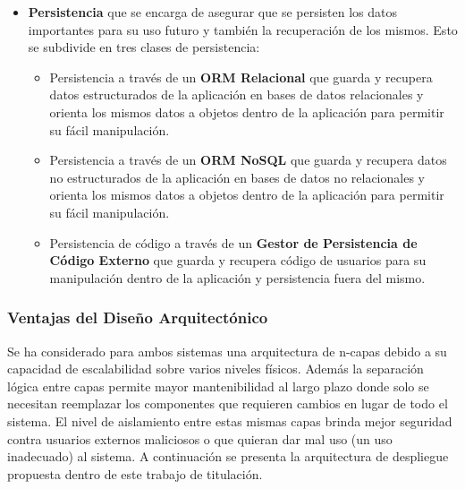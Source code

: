 \begin{itemize}
\begin{itemize}
    \end{itemize}
	\item \textbf{Persistencia} que se encarga de asegurar que se persisten los datos importantes para su uso futuro y también la recuperación de los mismos. Esto se subdivide en tres clases de persistencia:
    \begin{itemize}
    	\item Persistencia a través de un \textbf{ORM Relacional} que guarda y recupera datos estructurados de la aplicación en bases de datos relacionales y orienta los mismos datos a objetos dentro de la aplicación para permitir su fácil manipulación.
		\item Persistencia a través de un \textbf{ORM NoSQL} que guarda y recupera datos no estructurados de la aplicación en bases de datos no relacionales y orienta los mismos datos a objetos dentro de la aplicación para permitir su fácil manipulación.
		\item Persistencia de código a través de un \textbf{Gestor de Persistencia de Código Externo} que guarda y recupera código de usuarios para su manipulación dentro de la aplicación y persistencia fuera del mismo.
    \end{itemize}
\end{itemize}

\subsubsection{Ventajas del Diseño Arquitectónico}
Se ha considerado para ambos sistemas una arquitectura de n-capas debido a su capacidad de escalabilidad sobre varios niveles físicos. Además la separación lógica entre capas permite mayor mantenibilidad al largo plazo donde solo se necesitan reemplazar los componentes que requieren cambios en lugar de todo el sistema. El nivel de aislamiento entre estas mismas capas brinda mejor seguridad contra usuarios externos maliciosos o que quieran dar mal uso (un uso inadecuado) al sistema. A continuación se presenta la arquitectura de despliegue propuesta dentro de este trabajo de titulación.

